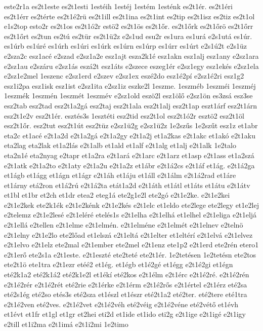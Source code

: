 {este2r1a
es2t1este
es2t1esti
1estéih
1estéj
1estém
1esténk
es2t1ér.
es2t1éri
es2t1érr
es2térte
es2t1é2rü
es2t1ill
es2t1ina
es2t1int
es2tip
es2t1isz
es2tiz
es2t1ol
e1s2top
esto2r
es2t1os
es2t1ó2r
estö2
es2t1ös
es2t1őr.
es2t1őrk
es2t1őrö
es2t1őrr
es2t1őrt
es2tun
es2tú
es2tür
es2t1ü2z
e2s1ud
esu2r
es1ura
es1urá
e2s1utá
es1úr.
es1úrb
es1úré
es1úrh
es1úri
es1úrk
es1úrn
es1úrp
es1úrr
es1úrt
e2s1ú2t
e2s1üz
e2sza2c
esz1acé
e2szad
e2sz1a2e
esz1ajt
esza2k1é
esz1akn
esz1alj
esz1any
e2sz1ara
e2sz1au
e2száru
e2sz1ás
eszá2t
esz1áts
e2szece
eszeg1ér
e2sz1egy
esz1ekés
e2sz1ela
e2sz1e2mel
1eszenc
e2sz1erd
e2szev
e2sz1ex
eszé2do
esz1é2pí
e2sz1é2ri
esz1g2
esz1i2pa
esz1isk
esz1ist
e2sz1ita
e2sz1iz
eszke2l
1eszme.
1eszméb
1eszméi
1eszméj
1eszmék
1eszmén
1eszmét
1eszmév
e2sz1old
eszö2l
esz1ölő
e2sz1ön
es3zsá
esz3se
esz2tab
esz2tad
esz2t1a2gá
esz2taj
esz2t1ala
esz2t1alj
esz2t1ap
eszt1árf
esz2t1árn
esz2t1e2v
esz2t1ér.
esztés3s
1esztéti
esz2tid
esz2t1ol
esz2t1ó2r
esztö2
esz2t1öl
esz2t1őr.
esz2tut
esz2t1út
esz2tüz
e2sz1ü2g
e2sz1ü2z
1e2szűs
1e2szűt
esz1z
et1abr
eta2c
et1acé
e2t1a2d
e2t1a2gá
e2t1a2gy
e2t1a2j
et1a2kas
e2t1akc
et1akó
e2t1aku
eta2lag
eta2lak
et1a2lás
e2t1alb
et1ald
et1alf
e2t1alg
et1alj
e2t1alk
1e2talo
eta2n1é
eta2nyag
e2tapr
et1a2ra
e2t1ará
e2t1arc
e2t1arz
et1asp
e2t1ass
et1a2szá
e2t1atk
e2t1a2to
e2t1aty
e2t1a2u
e2t1a2z
et1ábr
e2t1á2cs
e2t1áf
et1ág.
e2t1á2ga
et1ágb
et1ágg
et1ágn
et1ágr
e2t1áh
et1áju
et1áll
e2t1álm
e2t1á2rad
et1áre
et1árny
etá2ron
et1á2rú
e2t1á2ta
etát1a2d
e2t1áth
et1átl
et1áts
et1átu
e2t1átv
et1bl
et1br
et2ch
et1dr
etea2
eteg1á
ete2g1e2l
ete2gó
e2t1e2ke.
e2t1e2kei
e2t1e2kek
ete2k1ék
e2t1e2kénk
e2t1e2kés
e2t1elc
et1eldo
ete2lege
ete2legy
et1e2lej
e2telemz
e2t1e2lesé
e2t1eléré
etelés1s
e2t1elha
e2t1elhá
et1elhel
e2t1eliga
e2t1eljá
e2t1ellá
e2tellen
e2t1elme
e2t1elmén.
e2t1elméne
e2t1elmét
e2t1elnev
e2telnö
e2t1elny
e2t1e2lo
ete2lőad
et1elszá
e2t1eltá
e2t1elter
et1eltérí
e2t1elvá
e2t1elvez
e2t1elvo
e2t1elz
ete2mal
e2t1ember
ete2mel
e2t1enz
ete1p2
e2t1erd
ete2rén
etero1
e2t1erő
ete2s1a
e2t1este.
e2t1eszté
ete2teté
ete2t1ér.
1e2tetésen
1e2tetésn
ete2tos
ete2t1ö
ete1tra
e2t1ezr
etéé2
et1ég.
et1égb
et1é2gé
et1égg
e2t1é2gi
et1égn
eté2k1a2
eté2k1á2
eté2k1e2l
et1ékí
eté2kos
e2t1élm
e2t1érc
e2t1é2ré.
e2t1é2rén
e2t1é2rér
e2t1é2rét
eté2rie
e2t1érke
e2t1érm
e2t1é2rős
e2t1értel
e2t1érz
eté2sa
eté2s1ég
eté2so
etés3s
eté2sza
et1észl
et1észr
eté2t1a2
eté2ter.
eté2tere
eté1tra
e2t1é2ven
eté2ves.
e2t1é2vet
e2t1é2véh
eté2véig
e2t1é2véne
eté2vétő
et1évh
et1évt
et1fr
et1gl
et1gr
et2hei
eti2d
et1ide
et1ido
eti2g
e2t1ige
e2t1igé
e2t1igy
e2till
et1i2ma
e2t1imá
e2t1i2mi
1e2timo
}

